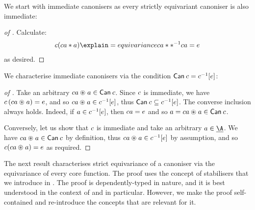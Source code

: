 We start with immediate canonisers as every strictly equivariant
canoniser is also immediate:
\begin{proof}[of ]%
  Calculate:
  \[
  \canoniser(\canoniser a \mul a)
  \explain={equivariance}
  \canoniser a \mul \inv*{\canoniser a}
  =
  \unit
  \]
  as desired.
\end{proof}

We characterise immediate canonisers
via the condition $\Canon\canoniser =
\inv\canoniser[\unit]$:

\begin{proof}[of ]%
  Take an arbitrary $\canoniser a \act a \in \Canon\canoniser$. Since
  $c$ is immediate, we have $\canoniser \parent{\canoniser a \act a}
  = \unit$, and so $\canoniser a \act a \in \inv{\canoniser}[\unit]$,
  thus $\Canon\canoniser \subseteq \inv{\canoniser}[\unit]$. The
  converse inclusion always holds. Indeed, if $a \in \inv{\canoniser}[\unit]$,
  then $\canoniser a = \unit$ and so $a = \canoniser a \act a \in
  \Canon\canoniser$.

  Conversely, let us show that $c$ is immediate and take an
  arbitrary $a \in \carrier\A$. We have $\canoniser a \act a \in
  \Canon\canoniser$ by definition, thus $\canoniser a \act a \in
  \inv{\canoniser}[\unit]$ by assumption, and so
  $\canoniser(\canoniser a \act a) = \unit$ as required.
\end{proof}



The next result characterises strict equivariance of a canoniser via the
equivariance of every core function. The proof uses the concept of
stabilisers that we introduce in .
The proof is dependently-typed in nature, and it is best understood in
the context of  and  in particular. However, we make the proof self-contained
and re-introduce the concepts that are relevant for it.


